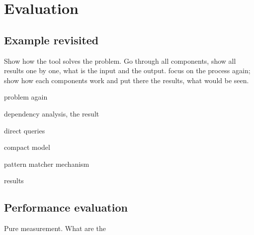 \chapter{Evaluation}

\section{Example revisited}
Show how the tool solves the problem. Go through all components, show all
results one by one, what is the input and the output.
focus on the process again; show how each components work and put there the results, what would be seen.

problem again

dependency analysis, the result

direct queries

compact model

pattern matcher mechanism

results



\section{Performance evaluation}
Pure measurement. What are the 